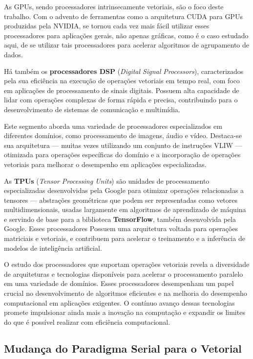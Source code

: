 \documentclass[12pt,
openright, 
oneside, %
a4paper,    %
brazil]{facom-ufu-abntex2}
\begin{document}
As GPUs, sendo processadores intrinsecamente vetoriais, são o foco deste trabalho. Com o advento de ferramentas como a arquitetura CUDA para GPUs produzidas pela NVIDIA, se tornou cada vez mais fácil utilizar esses processadores para aplicações gerais, não apenas gráficas, como é o caso estudado aqui, de se utilizar tais processadores para acelerar algoritmos de agrupamento de dados.

Há também os \textbf{processadores DSP} (\textit{Digital Signal Processors}), caracterizados pela sua eficiência na execução de operações vetoriais em tempo real, com foco em aplicações de processamento de sinais digitais. Possuem alta capacidade de lidar com operações complexas de forma rápida e precisa, contribuindo para o desenvolvimento de sistemas de comunicação e multimídia.

Este segmento aborda uma variedade de processadores especializados em diferentes domínios, como processamento de imagens, áudio e vídeo. Destaca-se sua arquitetura --- muitas vezes utilizando um conjunto de instruções VLIW --- otimizada para operações específicas do domínio e a incorporação de operações vetoriais para melhorar o desempenho em aplicações especializadas.

As \textbf{TPUs} (\textit{Tensor Processing Units}) são unidades de processamento especializadas desenvolvidas pela Google para otimizar operações relacionadas a tensores --- abstrações geométricas que podem ser representadas como vetores multidimensionais, usadas largamente em algoritmos de aprendizado de máquina e servindo de base para a biblioteca \textbf{TensorFlow}, também desenvolvida pela Google. Esses processadores Possuem uma arquitetura voltada para operações matriciais e vetoriais, e contribuem para acelerar o treinamento e a inferência de modelos de inteligência artificial.

O estudo dos processadores que suportam operações vetoriais revela a diversidade de arquiteturas e tecnologias disponíveis para acelerar o processamento paralelo em uma variedade de domínios. Esses processadores desempenham um papel crucial no desenvolvimento de algoritmos eficientes e na melhoria do desempenho computacional em aplicações exigentes. O contínuo avanço dessas tecnologias promete impulsionar ainda mais a inovação na computação e expandir os limites do que é possível realizar com eficiência computacional.



\subsection{Mudança do Paradigma Serial para o Vetorial}
\end{document}
